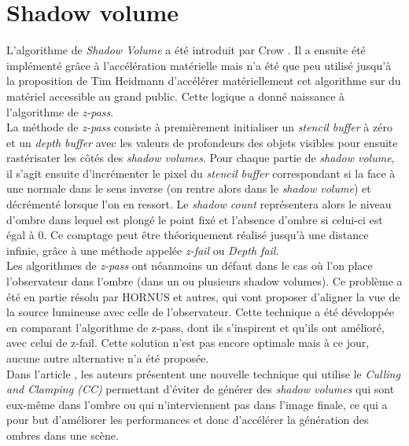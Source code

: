\documentclass[a4paper,12pt]{report}
\begin{document}
\section{Shadow volume}


L'algorithme de \textit{Shadow Volume} a été introduit par Crow \cite{crow1977shadow}. Il a ensuite été implémenté grâce à l'accélération  matérielle\cite{fuchs1986fast} mais n'a été que peu utilisé jusqu'à la proposition de Tim Heidmann d'accélérer matériellement cet algorithme sur du matériel accessible au grand public. Cette logique a donné naissance à l'algorithme de \textit{z-pass}\cite{heidmann1991real}. 
\\

La méthode de \textit{z-pass} consiste à premièrement initialiser un \textit{stencil buffer} à zéro et un \textit{depth buffer} avec les valeurs de profondeurs des objets visibles pour ensuite rastérisater les côtés des \textit{shadow volumes}. Pour chaque partie de \textit{shadow volume}, il s'agit ensuite d'incrémenter le pixel du \textit{stencil buffer} correspondant si la face à une normale dans le sens inverse (on rentre alors dans le \textit{shadow volume}) et décrémenté lorsque l'on en ressort. Le \textit{shadow count} représentera alors le niveau d'ombre dans lequel est plongé le point fixé et l'absence d'ombre si celui-ci est égal à 0.\cite{surveyofshadowalgorithms} Ce comptage peut être théoriquement réalisé jusqu'à une distance infinie, grâce à une méthode appelée \textit{z-fail} ou \textit{Depth fail}\cite{bilodeau1999real, carmack2000z}.
\\

Les algorithmes de \textit{z-pass} ont néanmoins un défaut dans le cas où l'on place l'observateur dans l'ombre (dans un ou plusieurs shadow volumes). Ce problème a été en partie résolu par HORNUS et autres\cite{hornus2005zp+}, qui vont proposer d'aligner la vue de la source lumineuse avec celle de l'observateur. Cette technique a été développée en comparant l'algorithme de z-pass, dont ils s'inspirent et qu'ils ont amélioré, avec celui de z-fail. Cette solution n'est pas encore optimale mais à ce jour, aucune autre alternative n'a été proposée.
\\

Dans l'article \cite{lloyd2004cc}, les auteurs présentent une nouvelle technique qui utilise le \textit{Culling and Clamping (CC)} permettant d'éviter de générer des \textit{shadow volumes} qui sont eux-même dans l'ombre ou qui n'interviennent pas dans l'image finale, ce qui a pour but d'améliorer les performances et donc d'accélérer la génération des ombres dans une scène.
\\
\end{document}
